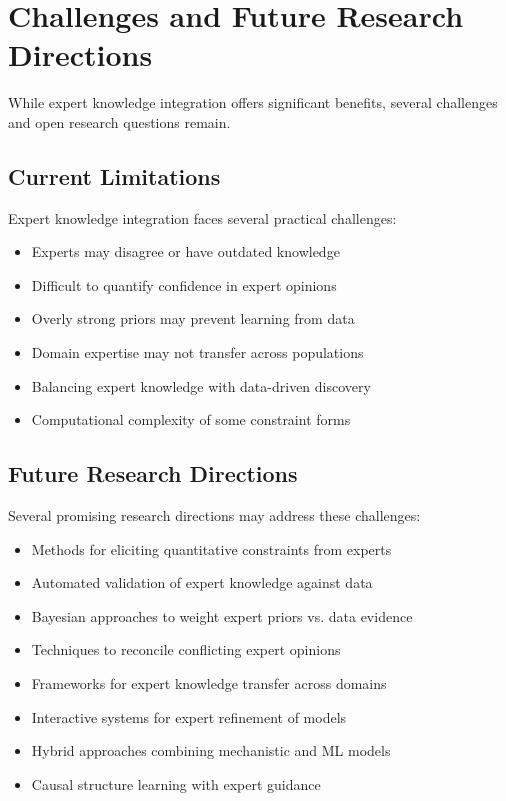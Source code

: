 \section{Challenges and Future Research Directions}

While expert knowledge integration offers significant benefits, several challenges and open research questions remain.

\subsection{Current Limitations}

Expert knowledge integration faces several practical challenges:

\begin{itemize}
    \item Experts may disagree or have outdated knowledge
    \item Difficult to quantify confidence in expert opinions
    \item Overly strong priors may prevent learning from data
    \item Domain expertise may not transfer across populations
    \item Balancing expert knowledge with data-driven discovery
    \item Computational complexity of some constraint forms
\end{itemize}

\subsection{Future Research Directions}

Several promising research directions may address these challenges:

\begin{itemize}
    \item Methods for eliciting quantitative constraints from experts
    \item Automated validation of expert knowledge against data
    \item Bayesian approaches to weight expert priors vs. data evidence
    \item Techniques to reconcile conflicting expert opinions
    \item Frameworks for expert knowledge transfer across domains
    \item Interactive systems for expert refinement of models
    \item Hybrid approaches combining mechanistic and ML models
    \item Causal structure learning with expert guidance
\end{itemize}

